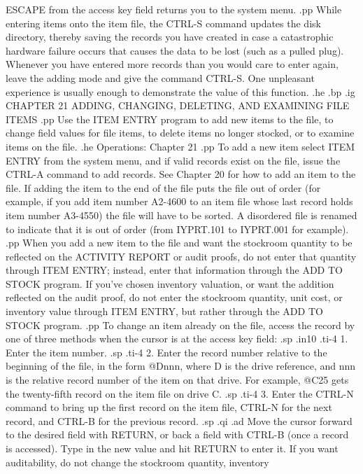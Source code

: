 ESCAPE from the access key field returns you to the system menu.
.pp
While entering items onto the item file, the CTRL-S command updates the
disk directory, thereby
saving the records you have created in case a catastrophic
hardware failure occurs that causes the data to be lost (such as
a pulled plug).  Whenever you have entered more records than you would
care to enter again, leave the adding mode and give the command CTRL-S.
One unpleasant experience is usually enough to demonstrate the value of this
function.
.he
.bp
.ig
CHAPTER 21
ADDING, CHANGING, DELETING, AND EXAMINING FILE ITEMS
.pp
Use the ITEM ENTRY program to add new items to the file, to change
field values for file items, to delete items no longer stocked, or
to examine items on the file.
.he Operations: Chapter 21
.pp
To add a new item select ITEM ENTRY from the system menu, and if valid
records exist on the file, issue the CTRL-A command to add records.  See
Chapter 20 for how to add an item to the file.	If adding the item to the
end of the file puts the file out of order (for example, if you
add item number A2-4600 to an item file whose last record holds item number
A3-4550) the file will have to be sorted. A disordered file is renamed to
indicate that it is out of order (from IYPRT.101 to IYPRT.001 for example).
.pp
When you add a new item to the file and
want the stockroom quantity to be reflected on the ACTIVITY REPORT or
audit proofs, do not enter that quantity through ITEM ENTRY;
instead, enter that information through the ADD TO STOCK
program.  If you've chosen inventory valuation, or want the addition
reflected on the audit proof, do not enter the stockroom quantity, unit
cost, or inventory value through ITEM ENTRY, but rather through the
ADD TO STOCK program.
.pp
To change an item already on the file, access the record by one of three
methods when the cursor is at the access key field:
.sp
.in10
.ti-4
1.  Enter the item number.
.sp
.ti-4
2.  Enter the record number relative to the beginning of the file,
in the form @Dnnn, where D is the drive reference, and nnn is the relative
record number of the item on that drive.  For example, @C25 gets the
twenty-fifth record on the item file on drive C.
.sp
.ti-4
3.  Enter the CTRL-N command to bring up the first record on the item file,
CTRL-N for the next record, and CTRL-B for the previous record.
.sp
.qi
.ad
Move the cursor forward to the desired field with RETURN, or back a
field with CTRL-B (once a record is accessed).
Type in the new value and hit RETURN to enter it.
If you want auditability, do not change the stockroom quantity, inventory
